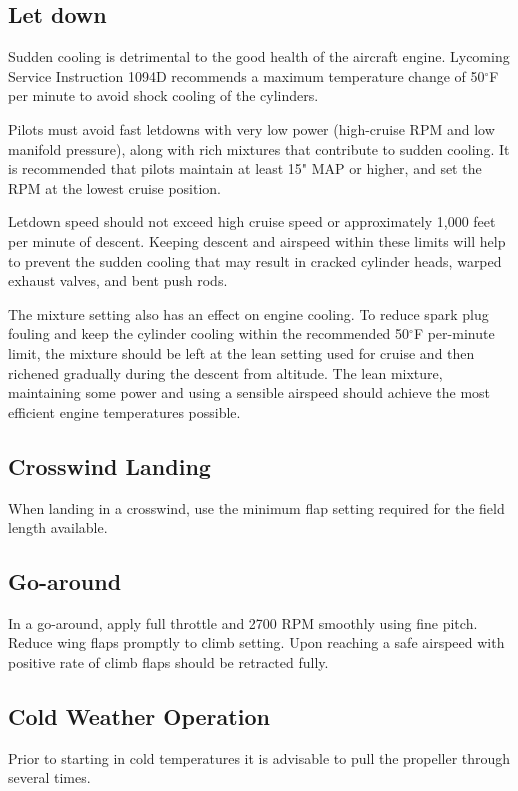 \subsection{Let down}
Sudden cooling is detrimental to the good health of the aircraft engine. Lycoming Service Instruction 1094D recommends a maximum temperature change of 50${^\circ}$F per minute to avoid shock cooling of the cylinders.

Pilots must avoid fast letdowns with very low power (high-cruise RPM and low manifold pressure), along with rich mixtures that contribute to sudden cooling. It is recommended that pilots maintain at least 15" MAP or higher, and set the RPM at the lowest cruise position. 

Letdown speed should not exceed high cruise speed or approximately 1,000 feet per minute of descent. Keeping descent and airspeed within these limits will help to prevent the sudden cooling that may result in cracked cylinder heads, warped exhaust valves, and bent push rods.

The mixture setting also has an effect on engine cooling. To reduce spark plug fouling and keep the cylinder cooling within the recommended 50${^\circ}$F per-minute limit, the mixture should be left at the lean setting used for cruise and then richened gradually during the descent from altitude. The lean mixture, maintaining some power and using a sensible airspeed should achieve the most efficient engine temperatures possible.

\subsection{Crosswind Landing }
When landing in a crosswind, use the minimum flap setting required for the field length available.

\subsection{Go-around }
In a go-around, apply full throttle and 2700 RPM smoothly using fine pitch.  Reduce wing flaps promptly to climb setting.   Upon reaching a safe airspeed with positive rate of climb flaps should be retracted fully.

\subsection{Cold Weather Operation}
Prior to starting in cold temperatures it is advisable to pull the propeller through several times.  

